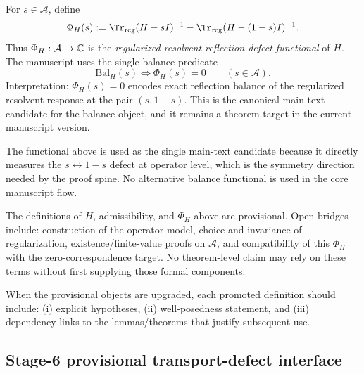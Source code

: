 \begin{definition}
For $s\in\mathcal{A}$, define
\[
\Phi_H(s)
:=
\Tr_{\mathrm{reg}}(H-sI)^{-1}
-
\Tr_{\mathrm{reg}}(H-(1-s)I)^{-1}.
\]
Thus $\Phi_H:\mathcal{A}\to\mathbb{C}$ is the \emph{regularized resolvent reflection-defect functional} of $H$.
The manuscript uses the single balance predicate
\[
\text{Bal}_H(s) \iff \Phi_H(s)=0 \qquad (s\in\mathcal{A}).
\]
Interpretation: $\Phi_H(s)=0$ encodes exact reflection balance of the regularized resolvent response at the pair $(s,1-s)$.
This is the canonical main-text candidate for the balance object, and it remains a theorem target in the current manuscript version.
\end{definition}

\begin{remark}
The functional above is used as the single main-text candidate because it directly measures the $s\leftrightarrow 1-s$ defect at operator level, which is the symmetry direction needed by the proof spine.
No alternative balance functional is used in the core manuscript flow.
\end{remark}

\begin{remark}
The definitions of $H$, admissibility, and $\Phi_H$ above are provisional.
Open bridges include: construction of the operator model, choice and invariance of regularization, existence/finite-value proofs on $\mathcal{A}$, and compatibility of this $\Phi_H$ with the zero-correspondence target.
No theorem-level claim may rely on these terms without first supplying those formal components.
\end{remark}

\begin{remark}
When the provisional objects are upgraded, each promoted definition should include: (i) explicit hypotheses, (ii) well-posedness statement, and (iii) dependency links to the lemmas/theorems that justify subsequent use.
\end{remark}

\subsection*{Stage-6 provisional transport-defect interface}

